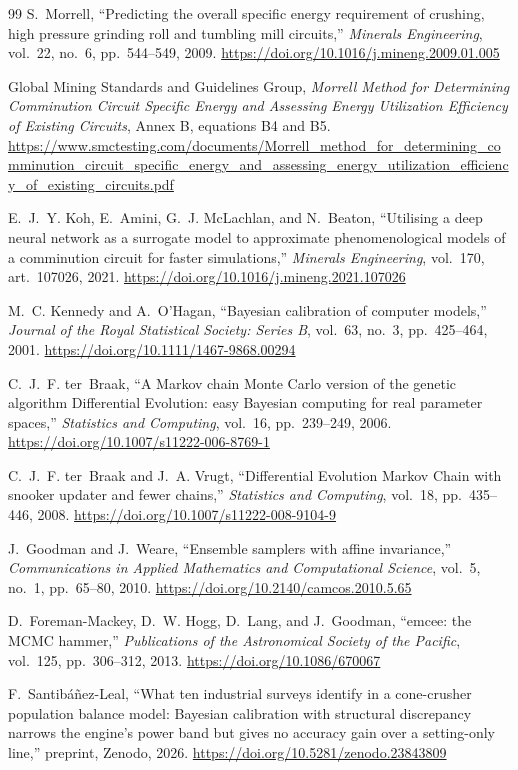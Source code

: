 \begin{thebibliography}{99}
 S.~Morrell, ``Predicting the overall specific energy requirement of crushing, high pressure grinding roll and tumbling mill
circuits,'' \emph{Minerals Engineering}, vol.~22, no.~6, pp.~544--549, 2009. \url{https://doi.org/10.1016/j.mineng.2009.01.005}

 Global Mining Standards and Guidelines Group, \emph{Morrell Method for Determining Comminution Circuit Specific Energy and Assessing
Energy Utilization Efficiency of Existing Circuits}, Annex B, equations B4 and B5.
\url{https://www.smctesting.com/documents/Morrell_method_for_determining_comminution_circuit_specific_energy_and_assessing_energy_utilization_efficiency_of_existing_circuits.pdf}

 E.~J.~Y. Koh, E.~Amini, G.~J. McLachlan, and N.~Beaton, ``Utilising a deep neural network as a surrogate model to approximate
phenomenological models of a comminution circuit for faster simulations,'' \emph{Minerals Engineering}, vol.~170, art.~107026, 2021.
\url{https://doi.org/10.1016/j.mineng.2021.107026}

 M.~C. Kennedy and A.~O'Hagan, ``Bayesian calibration of computer models,'' \emph{Journal of the Royal Statistical Society:
Series B}, vol.~63, no.~3, pp.~425--464, 2001. \url{https://doi.org/10.1111/1467-9868.00294}

 C.~J.~F. ter~Braak, ``A Markov chain Monte Carlo version of the genetic algorithm Differential Evolution: easy Bayesian computing
for real parameter spaces,'' \emph{Statistics and Computing}, vol.~16, pp.~239--249, 2006. \url{https://doi.org/10.1007/s11222-006-8769-1}

 C.~J.~F. ter~Braak and J.~A. Vrugt, ``Differential Evolution Markov Chain with snooker updater and fewer chains,''
\emph{Statistics and Computing}, vol.~18, pp.~435--446, 2008. \url{https://doi.org/10.1007/s11222-008-9104-9}

 J.~Goodman and J.~Weare, ``Ensemble samplers with affine invariance,'' \emph{Communications in Applied Mathematics and
Computational Science}, vol.~5, no.~1, pp.~65--80, 2010. \url{https://doi.org/10.2140/camcos.2010.5.65}

 D.~Foreman-Mackey, D.~W. Hogg, D.~Lang, and J.~Goodman, ``emcee: the MCMC hammer,'' \emph{Publications of the Astronomical Society
of the Pacific}, vol.~125, pp.~306--312, 2013. \url{https://doi.org/10.1086/670067}

 F.~Santib\'a\~nez-Leal, ``What ten industrial surveys identify in a cone-crusher population balance model: Bayesian
calibration with structural discrepancy narrows the engine's power band but gives no accuracy gain over a setting-only line,'' preprint,
Zenodo, 2026. \url{https://doi.org/10.5281/zenodo.23843809}


\end{thebibliography}
